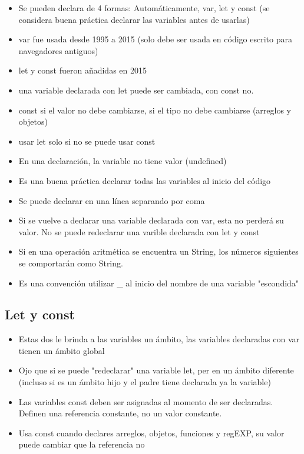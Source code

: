 \documentclass{article}
\begin{document}
 \begin{itemize}
   \item Se pueden declara de 4 formas: Automáticamente, var, let y const (se considera buena práctica declarar las variables antes de usarlas)
   \item var fue usada desde 1995 a 2015 (solo debe ser usada en código escrito para navegadores antiguos)
   \item let y const fueron añadidas en 2015
   \item una variable declarada con let puede ser cambiada, con const no.
   \item const si el valor no debe cambiarse, si el tipo no debe cambiarse (arreglos y objetos)
   \item usar let solo si no se puede usar const
   \item En una declaración, la variable no tiene valor (undefined)
   \item Es una buena práctica declarar todas las variables al inicio del código
   \item Se puede declarar en una línea separando por coma
   \item Si se vuelve a declarar una variable declarada con var, esta no perderá su valor. No se puede redeclarar una varible declarada con let y const
   \item Si en una operación aritmética se encuentra un String, los números siguientes se comportarán como String.
   \item Es una convención utilizar _ al inicio del nombre de una variable "escondida"
 \end{itemize}

 \subsection{Let y const}

 \begin{itemize}
   \item Estas dos le brinda a las variables un ámbito, las variables declaradas con var tienen un ámbito global
   \item Ojo que si se puede "redeclarar" una variable let, per en un ámbito diferente (incluso si es un ámbito hijo y el padre tiene declarada ya la variable)
   \item Las variables const deben ser asignadas al momento de ser declaradas. Definen una referencia constante, no un valor constante.
   \item Usa const cuando declares arreglos, objetos, funciones y regEXP, su valor puede cambiar que la referencia no
 \end{itemize}
\end{document}
